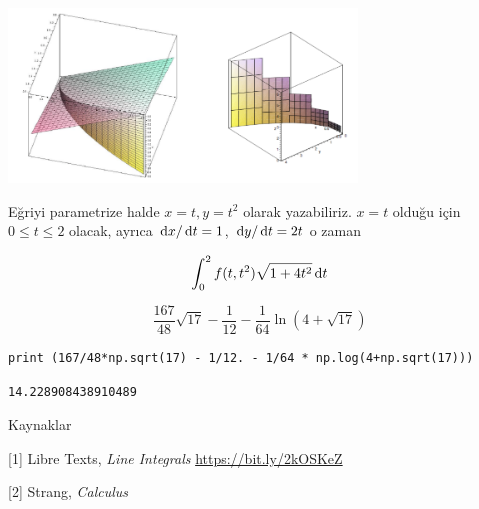 \documentclass[12pt,fleqn]{article}\usepackage{../../common}
\begin{document}
\includegraphics[width=25em]{19_14.png}

Eğriyi parametrize halde $x=t,y=t^2$ olarak yazabiliriz. $x=t$ olduğu için
$0 \le t \le 2$ olacak, ayrıca $\,\mathrm{d} x/ \,\mathrm{d} t = 1$, $\,\mathrm{d} y / \,\mathrm{d} t = 2t$ o
zaman

$$
\int_{0}^{2} f(t, t^2) \sqrt{1 + 4t^2} \,\mathrm{d} t
$$

$$
\frac{167}{48} \sqrt{17} - \frac{1}{12} - \frac{1}{64} \ln (4 + \sqrt{17})
$$

\begin{verbatim}
print (167/48*np.sqrt(17) - 1/12. - 1/64 * np.log(4+np.sqrt(17)))
\end{verbatim}

\begin{verbatim}
14.228908438910489
\end{verbatim}


Kaynaklar

[1] Libre Texts, {\em Line Integrals}
   \url{https://bit.ly/2kOSKeZ}

[2] Strang, {\em Calculus}
\end{document}
